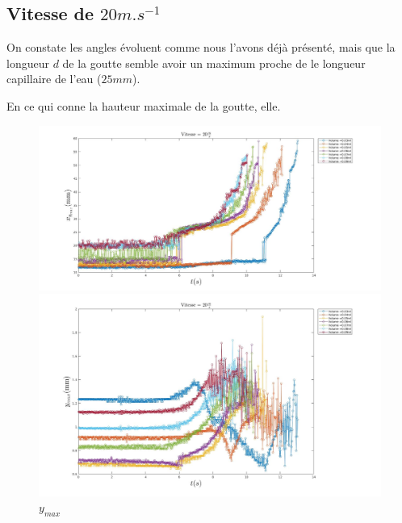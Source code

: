 \newpage
\subsection{Vitesse de $20m.s^{-1}$}

On constate les angles évoluent comme nous l'avons déjà présenté, mais que la longueur $d$ de la goutte semble avoir un maximum proche de le longueur capillaire de l'eau ($25 mm$).

En ce qui conne la hauteur maximale de la goutte, elle.
\begin{figure}[!h]
	\centering
	\begin{minipage}{0.95\linewidth}
	\includegraphics[width = \linewidth]{./image/v=20xm.jpg}
	\caption{$x_{max}$}
		\label{fig:v=20xm}
	\end{minipage}
	\begin{minipage}{0.95\linewidth}
	\includegraphics[width = \linewidth]{./image/v=20ym.jpg}
	\caption{$y_{max}$}
		\label{fig:v=20ym}
	\end{minipage}
\end{figure}

